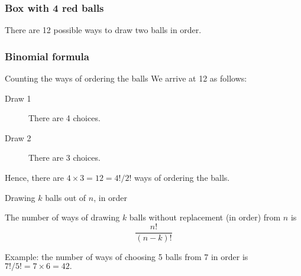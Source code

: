 \documentclass[handout]{beamer}
\begin{document}
   \begin{frame}
   \frametitle{Box with 4 red balls}
   \begin{center}
   \end{center}
   There are 12 possible ways to draw two balls in order.
   \end{frame}


   \begin{frame} \frametitle{Binomial formula}

   \begin{block}
   {Counting the ways of ordering the balls}
   We arrive at 12 as follows:
   \begin{description}

   \item[Draw 1] There are 4 choices.

   \item[Draw 2] There are 3 choices.

   \end{description}

   Hence, there are $4 \times 3 = 12 = 4! / 2!$ ways
   of ordering the balls.
   \end{block}

   \begin{block}
   {Drawing $k$ balls out of $n$, in order}

   The number of ways of drawing $k$ balls without replacement (in order)
   from $n$ is
   $$
   \frac{n!}{(n-k)!}
   $$

   Example: the number of ways of choosing 5 balls from 7 in order is
   $7! / 5! = 7 \times 6 = 42.$
   \end{block}
   \end{frame}

\end{document}
